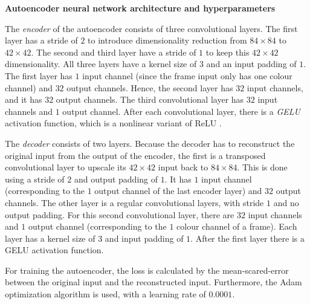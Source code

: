 \noindent \textbf{Autoencoder neural network architecture and hyperparameters}\par
\noindent The \emph{encoder} of the autoencoder consists of three convolutional layers. The first layer has a stride of $2$ to introduce dimensionality reduction from $84 \times 84$ to $42 \times 42$. The second and third layer have a stride of $1$ to keep this $42 \times 42$ dimensionality. All three layers have a kernel size of $3$ and an input padding of $1$. The first layer has $1$ input channel (since the frame input only has one colour channel) and $32$ output channels. Hence, the second layer has $32$ input channels, and it has $32$ output channels. The third convolutional layer has $32$ input channels and $1$ output channel. After each convolutional layer, there is a \emph{GELU} activation function, which is a nonlinear variant of ReLU \cite{gelu}.

The \emph{decoder} consists of two layers. Because the decoder has to reconstruct the original input from the output of the encoder, the first is a transposed convolutional layer to upscale its $42 \times 42$ input back to $84 \times 84$. This is done using a stride of $2$ and output padding of $1$. It has $1$ input channel (corresponding to the $1$ output channel of the last encoder layer) and $32$ output channels. The other layer is a regular convolutional layers, with stride $1$ and no output padding. For this second convolutional layer, there are $32$ input channels and $1$ output channel (corresponding to the $1$ colour channel of a frame). Each layer has a kernel size of $3$ and input padding of $1$. After the first layer there is a GELU activation function.

For training the autoencoder, the loss is calculated by the mean-scared-error between the original input and the reconstructed input. Furthermore, the Adam optimization algorithm is used, with a learning rate of $0.0001$. 
